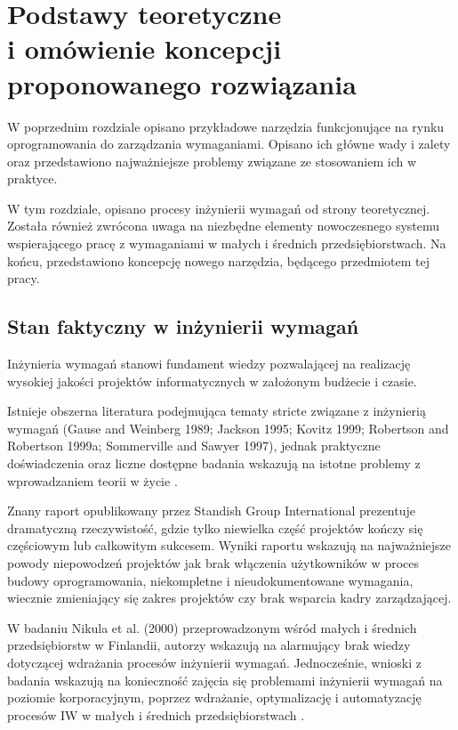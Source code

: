 \chapter{Podstawy teoretyczne \\i omówienie koncepcji proponowanego rozwiązania}
  
  W poprzednim rozdziale opisano przykładowe narzędzia funkcjonujące na rynku oprogramowania do zarządzania wymaganiami. Opisano ich główne wady i zalety oraz przedstawiono najważniejsze problemy związane ze stosowaniem ich w praktyce.

  W tym rozdziale, opisano procesy inżynierii wymagań od strony teoretycznej. Została również zwrócona uwaga na niezbędne elementy nowoczesnego systemu wspierającego pracę z wymaganiami w małych i średnich przedsiębiorstwach. Na końcu, przedstawiono koncepcję nowego narzędzia, będącego przedmiotem tej pracy.
  
  \section{Stan faktyczny w inżynierii wymagań}

    Inżynieria wymagań stanowi fundament wiedzy pozwalającej na realizację wysokiej jakości projektów informatycznych w założonym budżecie i czasie. 

    Istnieje obszerna literatura podejmująca tematy stricte związane z inżynierią wymagań (Gause and Weinberg 1989; Jackson 1995; Kovitz 1999; Robertson and Robertson 1999a; Sommerville and Sawyer 1997), jednak praktyczne doświadczenia oraz liczne dostępne badania wskazują na istotne problemy z wprowadzaniem teorii w życie \cite{Boehm06, Niku00, Standish94}.

    Znany raport opublikowany przez Standish Group International \cite{Standish94} prezentuje dramatyczną rzeczywistość, gdzie tylko niewielka część projektów kończy się częściowym lub całkowitym sukcesem. Wyniki raportu wskazują na najważniejsze powody niepowodzeń projektów jak brak włączenia użytkowników w proces budowy oprogramowania, niekompletne i nieudokumentowane wymagania, wiecznie zmieniający się zakres projektów czy brak wsparcia kadry zarządzającej.      
    
    W badaniu Nikula et al. (2000) przeprowadzonym wśród małych i średnich przedsiębiorstw w Finlandii, autorzy wskazują na alarmujący brak wiedzy dotyczącej wdrażania procesów inżynierii wymagań. Jednocześnie, wnioski z badania wskazują na konieczność zajęcia się problemami inżynierii wymagań na poziomie korporacyjnym, poprzez wdrażanie, optymalizację i automatyzację procesów IW w małych i średnich przedsiębiorstwach \cite{Niku00}.
    
